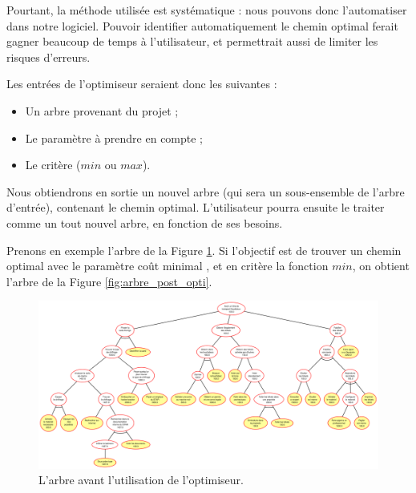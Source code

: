 		Pourtant, la méthode utilisée est systématique : nous pouvons donc l'automatiser dans notre logiciel. Pouvoir identifier automatiquement le chemin optimal ferait gagner beaucoup de temps à l'utilisateur, et permettrait aussi de limiter les risques d'erreurs.

		Les entrées de l'optimiseur seraient donc les suivantes :
		\begin{itemize}
			\item Un arbre provenant du projet ;
			\item Le paramètre à prendre en compte ;
			\item Le critère ($min$ ou $max$).
		\end{itemize}

		Nous obtiendrons en sortie un nouvel arbre (qui sera un sous-ensemble de l'arbre d'entrée), contenant le chemin optimal. L'utilisateur pourra ensuite le traiter comme un tout nouvel arbre, en fonction de ses besoins.
		
		Prenons en exemple l'arbre de la {\sc Figure} \ref{fig:pre_optimiseur}. Si l'objectif est de trouver un chemin optimal avec le paramètre \og coût minimal \fg{}, et en critère la fonction $min$, on obtient l'arbre de la {\sc Figure} \ref{fig:arbre_post_opti}.
		
		\begin{landscape}
	        \begin{figure}
	            \includegraphics[height=0.82\textwidth]{figure/pre_optimiseur.pdf}
	            \caption{L'arbre avant l'utilisation de l'optimiseur.}
	            \label{fig:pre_optimiseur}
	        \end{figure}
    	\end{landscape}		
		
